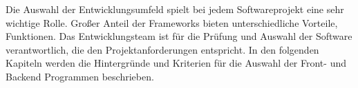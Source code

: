 
\begin{spacing}{1}  
\end{spacing}
Die Auswahl der Entwicklungsumfeld spielt bei jedem Softwareprojekt eine sehr
wichtige Rolle. Großer Anteil der Frameworks bieten unterschiedliche Vorteile,
Funktionen. 
Das Entwicklungsteam ist für die Prüfung und Auswahl der Software verantwortlich,
die den Projektanforderungen entspricht. In den folgenden Kapiteln werden
die Hintergründe und Kriterien für die Auswahl der Front- und Backend Programmen
beschrieben. 